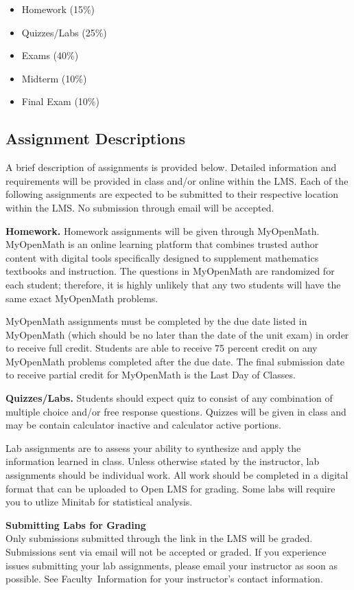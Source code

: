 \documentclass[11pt]{article}
\renewenvironment{framed}[1][]{%
  \def\FrameCommand{%
    \hspace{1pt}%
    {\color{mybordercolor}\vrule width 2pt} %
    \hspace{1pt}%
    \fboxsep=\FrameSep%
    \colorbox{mybgcolor}%
  }%
  \MakeFramed {\advance\hsize-\width \FrameRestore}%
}{%
  \endMakeFramed
}
\begin{document}
\begin{itemize}
\item Homework (15\%)
\item Quizzes/Labs (25\%)
\item Exams (40\%)
\item Midterm (10\%)
\item Final Exam (10\%)
\end{itemize}

\subsection{Assignment Descriptions}

A brief description of assignments is provided below. Detailed information and requirements will be provided in class and/or online within the LMS. Each of the following assignments are expected to be submitted to their respective location within the LMS. No submission through email will be accepted.

\textbf{Homework.} Homework assignments will be given through MyOpenMath. MyOpenMath is an online learning platform that combines trusted author content with digital tools specifically designed to supplement mathematics textbooks and instruction. The questions in MyOpenMath are randomized for each student; therefore, it is highly unlikely that any two students will have the same exact MyOpenMath problems.

MyOpenMath assignments must be completed by the due date listed in MyOpenMath (which should be no later than the date of the unit exam) in order to receive full credit. Students are able to receive 75 percent credit on any MyOpenMath problems completed after the due date. The final submission date to receive partial credit for MyOpenMath is the Last Day of Classes.

\textbf{Quizzes/Labs.} Students should expect quiz to consist of any combination of multiple choice and/or free response questions. Quizzes will be given in class and may be contain calculator inactive and calculator active portions.

Lab assignments are to assess your ability to synthesize and apply the information learned in class. Unless otherwise stated by the instructor, lab assignments should be individual work. All work should be completed in a digital format that can be uploaded to Open LMS for grading. Some labs will require you to utlize Minitab for statistical analysis.

\begin{framed}
\textbf{Submitting Labs for Grading}\\
Only submissions submitted through the link in the LMS will be graded. Submissions sent via email will not be accepted or graded. If you experience issues submitting your lab assignments, please email your instructor as soon as possible. See Faculty~Information for your instructor's contact information.
\end{framed}
\end{document}
